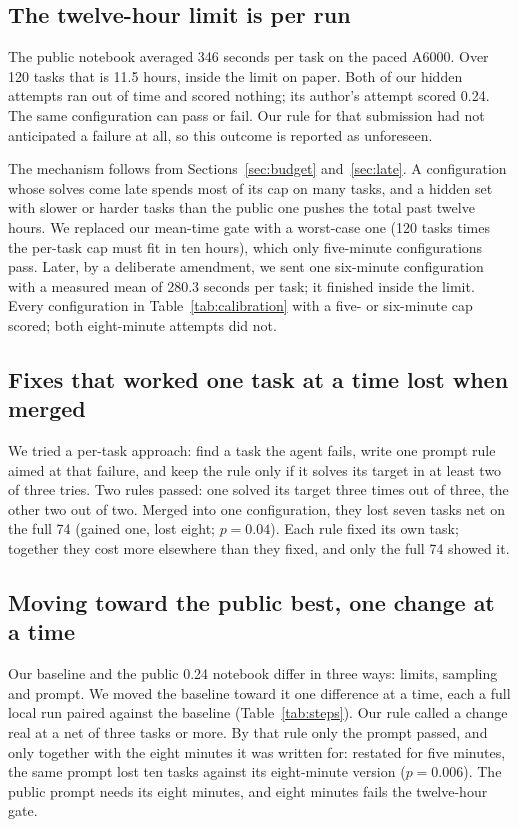 \documentclass[11pt]{article}
\begin{document}
\subsection{The twelve-hour limit is per run}
\label{sec:runtime}

The public notebook averaged 346 seconds per task on the paced A6000. Over 120 tasks that is 11.5 hours, inside the limit on
paper. Both of our hidden attempts ran out of time and scored nothing; its author's attempt scored 0.24. The same
configuration can pass or fail. Our rule for that submission had not anticipated a failure at all, so this outcome is reported
as unforeseen.

The mechanism follows from Sections~\ref{sec:budget} and~\ref{sec:late}. A configuration whose solves come late spends most
of its cap on many tasks, and a hidden set with slower or harder tasks than the public one pushes the total past twelve hours.
We replaced our mean-time gate with a worst-case one (120 tasks times the per-task cap must fit in ten hours), which only
five-minute configurations pass. Later, by a deliberate amendment, we sent one six-minute configuration with a measured mean of
280.3 seconds per task; it finished inside the limit. Every configuration in Table~\ref{tab:calibration} with a five- or six-minute cap
scored; both eight-minute attempts did not.

\subsection{Fixes that worked one task at a time lost when merged}
\label{sec:merge}

We tried a per-task approach: find a task the agent fails, write one prompt rule aimed at that failure, and keep the rule
only if it solves its target in at least two of three tries. Two rules passed: one solved its target three times out of
three, the other two out of two. Merged into one configuration, they lost seven tasks net on the full 74 (gained one, lost
eight; $p=0.04$). Each rule fixed its own task; together they cost more elsewhere than they fixed, and only the full 74 showed
it.

\subsection{Moving toward the public best, one change at a time}
\label{sec:steps}

Our baseline and the public 0.24 notebook differ in three ways: limits, sampling and prompt. We moved the baseline toward it
one difference at a time, each a full local run paired against the baseline (Table~\ref{tab:steps}). Our rule called a change
real at a net of three tasks or more. By that rule only the prompt passed, and only together with the eight minutes it was
written for: restated for five minutes, the same prompt lost ten tasks against its eight-minute version ($p=0.006$). The
public prompt needs its eight minutes, and eight minutes fails the twelve-hour gate.
\end{document}
